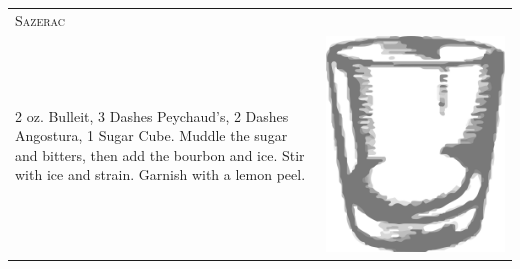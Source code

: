 \documentclass{article}
\begin{document}
\begin{multicols}{2}
\begin{tabular}{p{2in} p{0.5in}}
\multicolumn{2}{p{3in}}{\centering\Huge\textsc{Sazerac}} \\ 
  \vspace{-0.1in}2 oz. Bulleit, 3 Dashes Peychaud's, 2 Dashes Angostura, 1 Sugar Cube.  Muddle the sugar and bitters, then add the bourbon and ice. Stir with ice and strain. Garnish with a lemon peel. &
   \vspace{-0.1in} \includegraphics{rocks_glass.png}
\end{tabular}


\end{multicols}
\end{document}
